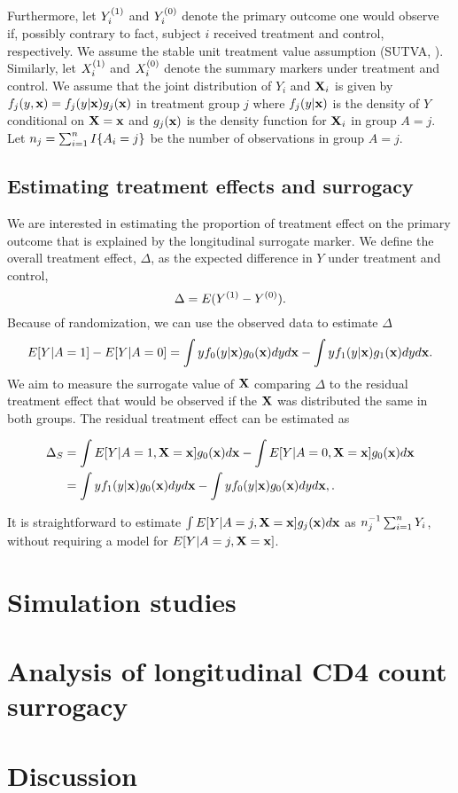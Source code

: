\documentclass[useAMS,usenatbib,referee]{biom}
\begin{document}
Furthermore, let \(Y_i^{(1)}\) and \(Y_i^{(0)}\) denote the primary
outcome one would observe if, possibly contrary to fact, subject \(i\)
received treatment and control, respectively. We assume the stable unit
treatment value assumption (SUTVA, \citet{rosenbaum1983central}).
Similarly, let \(X_i^{(1)}\) and \(X_i^{(0)}\) denote the summary markers
under treatment and control. We assume that the joint distribution of
\(Y_i\) and \({\bf X}_i\) is given by \(f_j(y, {\bf x}) = f_j(y|{\bf x})g_j({\bf x})\)
in treatment group \(j\) where \(f_j(y|{\bf x})\) is the density of \(Y\)
conditional on \({\bf X} = {\bf x}\) and \(g_j({\bf x})\) is the density function
for \({\bf X}_i\) in group \(A = j\). Let $n_j = \sum_{i=1}^n I\{A_i = j\}$ be the number of observations in group $A = j$.

\subsection{Estimating treatment effects and
surrogacy}\label{estimating-treatment-effects-and-surrogacy}

We are interested in estimating the proportion of treatment effect on
the primary outcome that is explained by the longitudinal surrogate
marker. We define the overall treatment effect, \(\Delta\), as the
expected difference in \(Y\) under treatment and control,
\[\Delta=E(Y^{(1)}-Y^{(0)}).\] Because of randomization, we can use the
observed data to estimate \(\Delta\)
\[E[Y | A = 1] - E[Y | A = 0] = \int y f_0(y|{\bf x})g_0({\bf x})dyd{\bf x} - \int y f_1(y|{\bf x})g_1({\bf x})dyd{\bf x}.\]
We aim to measure the surrogate value of \({\bf X}\) comparing \(\Delta\) to
the residual treatment effect that would be observed if the \({\bf X}\) was
distributed the same in both groups. The residual treatment effect can
be estimated as

\begin{align*}
\Delta_S &= \int E[Y | A = 1, \bX = \bx]g_0(\bx)d\bx - \int E[Y | A = 0, \bX = \bx]g_0(\bx)d\bx \\
&= \int y f_1(y|\bx)g_0(\bx)dyd\bx - \int y f_0(y|\bx)g_0(\bx)dyd\bx, \label{residual_effect}.
\end{align*}

It is straightforward to estimate $\int E[Y | A = j, {\bf X} = {\bf x}]g_j({\bf x})d{\bf x}$ as $n_j^{-1}\sum_{i=1}^n Y_i$, without requiring a model for $E[Y | A = j, {\bf X} = {\bf x}]$.

\section{Simulation studies}\label{sec:2}

\section{Analysis of longitudinal CD4 count
surrogacy}\label{analysis-of-longitudinal-cd4-count-surrogacy}

\section{Discussion}\label{discussion}






\label{lastpage}
\end{document}
